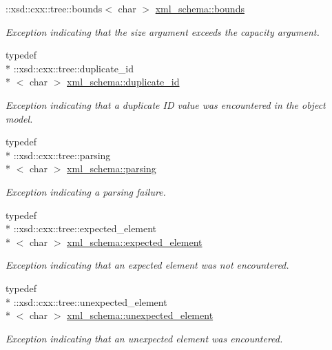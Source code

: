 \begin{DoxyCompactItemize}
\-::xsd\-::cxx\-::tree\-::bounds$<$ char $>$ \hyperlink{namespacexml__schema_a0130942a2c58fd1fda434722d42ede1d}{xml\-\_\-schema\-::bounds}
\begin{DoxyCompactList}\small\item\em Exception indicating that the size argument exceeds the capacity argument. \end{DoxyCompactList}\item 
typedef \\*
\-::xsd\-::cxx\-::tree\-::duplicate\-\_\-id\\*
$<$ char $>$ \hyperlink{namespacexml__schema_a6dc417261c18af4fcce090133dd605f8}{xml\-\_\-schema\-::duplicate\-\_\-id}
\begin{DoxyCompactList}\small\item\em Exception indicating that a duplicate I\-D value was encountered in the object model. \end{DoxyCompactList}\item 
typedef \\*
\-::xsd\-::cxx\-::tree\-::parsing\\*
$<$ char $>$ \hyperlink{namespacexml__schema_afbb8ed049be1751901785a29a6d13942}{xml\-\_\-schema\-::parsing}
\begin{DoxyCompactList}\small\item\em Exception indicating a parsing failure. \end{DoxyCompactList}\item 
typedef \\*
\-::xsd\-::cxx\-::tree\-::expected\-\_\-element\\*
$<$ char $>$ \hyperlink{namespacexml__schema_a8deca57d1e322d97eea32518a7237a49}{xml\-\_\-schema\-::expected\-\_\-element}
\begin{DoxyCompactList}\small\item\em Exception indicating that an expected element was not encountered. \end{DoxyCompactList}\item 
typedef \\*
\-::xsd\-::cxx\-::tree\-::unexpected\-\_\-element\\*
$<$ char $>$ \hyperlink{namespacexml__schema_a381b3f3410f9f6ba1f44c5500d90345b}{xml\-\_\-schema\-::unexpected\-\_\-element}
\begin{DoxyCompactList}\small\item\em Exception indicating that an unexpected element was encountered. \end{DoxyCompactList}\item 

\end{DoxyCompactItemize}
